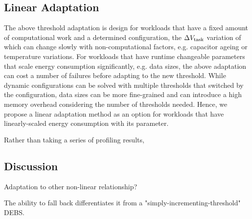 \subsection{Linear Adaptation}

The above threshold adaptation is design for workloads that have a fixed amount of computational work and a determined configuration, the $\Delta V_{\text{task}}$ variation of which can change slowly with non-computational factors, e.g. capacitor ageing or temperature variations.
For workloads that have runtime changeable parameters that scale energy consumption significantly, e.g. data sizes, the above adaptation can cost a number of failures before adapting to the new threshold. 
While dynamic configurations can be solved with multiple thresholds that switched by the configuration, data sizes can be more fine-grained and can introduce a high memory overhead considering the number of thresholds needed. 
Hence, we propose a linear adaptation method as an option for workloads that have linearly-scaled energy consumption with its parameter. 

Rather than taking a series of profiling results, 


\subsection{Discussion}

Adaptation to other non-linear relationship?

The ability to fall back differentiates it from a "simply-incrementing-threshold" DEBS.

